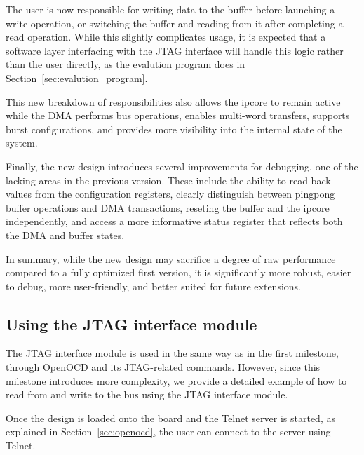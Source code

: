 \documentclass[a4paper,11pt,oneside]{report}
\begin{document}
The user is now responsible for writing data to the buffer before launching a write operation,  
or switching the buffer and reading from it after completing a read operation.  
While this slightly complicates usage, it is expected that a software layer interfacing with the JTAG interface will handle this logic rather than the user directly, as the evalution program does in 
Section~\ref{sec:evalution_program}.

This new breakdown of responsibilities also allows the ipcore to remain active while the DMA performs bus operations,  
enables multi-word transfers, supports burst configurations, and provides more visibility into the internal state of the system.

Finally, the new design introduces several improvements for debugging, one of the lacking areas in the previous version.  
These include the ability to read back values from the configuration registers,  
clearly distinguish between pingpong buffer operations and DMA transactions, reseting the buffer and the ipcore independently, 
and access a more informative status register that reflects both the DMA and buffer states.

In summary, while the new design may sacrifice a degree of raw performance compared to a fully optimized first version,  
it is significantly more robust, easier to debug, more user-friendly, and better suited for future extensions.

\subsection{Using the JTAG interface module}

The JTAG interface module is used in the same way as in the first milestone, through OpenOCD and its JTAG-related commands.  
However, since this milestone introduces more complexity, we provide a detailed example of how to read from and write to the bus using the JTAG interface module.

Once the design is loaded onto the board and the Telnet server is started, as explained in Section~\ref{sec:openocd}, the user can connect to the server using Telnet.
\end{document}
